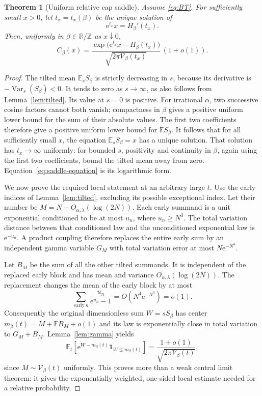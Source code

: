 \documentclass[11pt,a4paper]{article}
\newtheorem{theorem}{Theorem}[section]
\theoremstyle{definition}
\theoremstyle{remark}\newtheorem{remark}[theorem]{Remark}
\newcommand{\T}{\mathbb R/\mathbb Z}
\newcommand{\EE}{\mathbb E}
\newcommand{\Var}{\operatorname{Var}}
\newcommand{\VV}{\mathcal V}
\newcommand{\e}{\mathrm e}
\newcommand{\ind}{\mathbf 1}
\newcommand{\at}{\alpha,\lambda}
\begin{document}
\begin{theorem}[Uniform relative cap saddle]
\label{thm:saddle}
Assume \eqref{eq:BT}.  For sufficiently small $x>0$, let $t_x=t_x(\beta)$
be the unique solution of
\begin{equation}
 \e^{t_x}x=H_\beta'(t_x).
 \label{eq:saddle-equation}
\end{equation}
Then, uniformly in $\beta\in\T$ as $x\downarrow0$,
\begin{equation}
 C_\beta(x)=
 \frac{\exp\!\bigl(\e^{t_x}x-H_\beta(t_x)\bigr)}
      {\sqrt{2\pi\VV_\beta(t_x)}}\,(1+o(1)).
 \label{eq:saddle}
\end{equation}
\end{theorem}
\begin{proof}
The tilted mean $\EE_sS_\beta$ is strictly decreasing in $s$, because its
derivative is $-\Var_s(S_\beta)<0$.  It tends to zero as $s\to\infty$,
as also follows from Lemma~\ref{lem:tilted}.  Its value at $s=0$ is positive.
For irrational $\alpha$, two successive cosine factors cannot both vanish;
compactness in $\beta$ gives a positive uniform lower bound for the sum of
their absolute values.  The first two coefficients therefore give a positive
uniform lower bound for $\EE S_\beta$.  It follows that for all sufficiently
small $x$, the equation $\EE_sS_\beta=x$ has a unique solution.  That solution
has $t_x\to\infty$ uniformly: for bounded $s$, positivity and continuity in
$\beta$, again using the first two coefficients, bound the tilted mean away
from zero.  Equation~\eqref{eq:saddle-equation} is its logarithmic form.

We now prove the required local statement at an arbitrary large $t$.
Use the early indices of Lemma~\ref{lem:tilted}, excluding its possible
exceptional index.  Let their number be $M=N-O_{\at}(\log(2N))$.
Each early summand is a unit exponential conditioned to be at most $u_n$,
where $u_n\ge N^3$.  The total variation distance between that conditioned
law and the unconditioned exponential law is $\e^{-u_n}$.  A product coupling
therefore replaces the entire early sum by an independent gamma variable
$G_M$ with total variation error at most $N\e^{-N^3}$.

Let $B_M$ be the sum of all the other tilted summands.  It is independent
of the replaced early block and has mean and variance $O_{\at}(\log(2N))$.
The replacement changes the mean of the early block by at most
\[
 \sum_{\mathrm{early}\ n}\frac{u_n}{\e^{u_n}-1}
 =O(N^4\e^{-N^3})=o(1).
\]
Consequently the original dimensionless sum $W=sS_\beta$ has center
$m_\beta(t)=M+\EE B_M+o(1)$ and its law is exponentially close in total
variation to $G_M+B_M$.  Lemma~\ref{lem:gamma} yields
\begin{equation}
 \EE_t[\e^{W-m_\beta(t)}\ind_{W\le m_\beta(t)}]
 =\frac{1+o(1)}{\sqrt{2\pi\VV_\beta(t)}},
 \label{eq:localtilt}
\end{equation}
since $M\sim\VV_\beta(t)$ uniformly.  This proves more than a weak central
limit theorem: it gives the exponentially weighted, one-sided local estimate
needed for a relative probability.


\end{proof}
\end{document}
